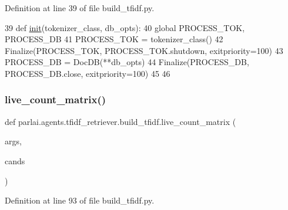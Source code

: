 Definition at line 39 of file build\+\_\+tfidf.\+py.


\begin{DoxyCode}
39 \textcolor{keyword}{def }\hyperlink{namespaceparlai_1_1agents_1_1tfidf__retriever_1_1build__tfidf_a297d8a6b3ed43b31feccf5707517fee3}{init}(tokenizer\_class, db\_opts):
40     \textcolor{keyword}{global} PROCESS\_TOK, PROCESS\_DB
41     PROCESS\_TOK = tokenizer\_class()
42     Finalize(PROCESS\_TOK, PROCESS\_TOK.shutdown, exitpriority=100)
43     PROCESS\_DB = DocDB(**db\_opts)
44     Finalize(PROCESS\_DB, PROCESS\_DB.close, exitpriority=100)
45 
46 
\end{DoxyCode}
\mbox{\label{namespaceparlai_1_1agents_1_1tfidf__retriever_1_1build__tfidf_af51dc8629608fd04435739ba76b1e8f2}} 
\subsubsection{\texorpdfstring{live\+\_\+count\+\_\+matrix()}{live\_count\_matrix()}}
{\footnotesize\ttfamily def parlai.\+agents.\+tfidf\+\_\+retriever.\+build\+\_\+tfidf.\+live\+\_\+count\+\_\+matrix (\begin{DoxyParamCaption}\item[{}]{args,  }\item[{}]{cands }\end{DoxyParamCaption})}



Definition at line 93 of file build\+\_\+tfidf.\+py.


